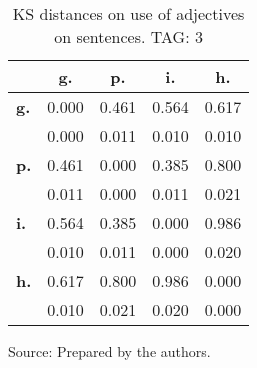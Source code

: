 \begin{table}[h!]
\begin{center}
\caption{KS distances on use of adjectives on sentences. TAG: 3}
\begin{tabular}{| l || c | c | c | c |}\hline
 & {\bf g.} & {\bf p.} & {\bf i.} & {\bf h.} \\\hline\hline
{\bf g.} & 0.000 & 0.461 & 0.564 & 0.617 \\
{\bf } & 0.000 & 0.011 & 0.010 & 0.010 \\\hline
{\bf p.} & 0.461 & 0.000 & 0.385 & 0.800 \\
{\bf } & 0.011 & 0.000 & 0.011 & 0.021 \\\hline
{\bf i.} & 0.564 & 0.385 & 0.000 & 0.986 \\
{\bf } & 0.010 & 0.011 & 0.000 & 0.020 \\\hline
{\bf h.} & 0.617 & 0.800 & 0.986 & 0.000 \\
{\bf } & 0.010 & 0.021 & 0.020 & 0.000 \\\hline
\end{tabular}
\begin{flushleft}
		Source: Prepared by the authors.\
\end{flushleft}
\end{center}
\end{table}
